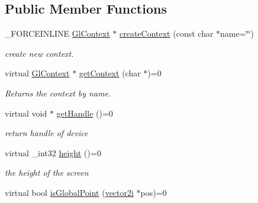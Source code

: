 \subsection*{Public Member Functions}
\begin{DoxyCompactItemize}
\item 
\hypertarget{classcsad_1_1_display_a20d187bd432fe8a53becfcf217f90029}{\-\_\-\-F\-O\-R\-C\-E\-I\-N\-L\-I\-N\-E \hyperlink{classcsad_1_1_gl_context}{Gl\-Context} $\ast$ \hyperlink{classcsad_1_1_display_a20d187bd432fe8a53becfcf217f90029}{create\-Context} (const char $\ast$name=\char`\"{}\char`\"{})}\label{classcsad_1_1_display_a20d187bd432fe8a53becfcf217f90029}

\begin{DoxyCompactList}\small\item\em create new context. \end{DoxyCompactList}\item 
\hypertarget{classcsad_1_1_display_aac6a3e516fe763e61fc6ddfeb130a8fb}{virtual \hyperlink{classcsad_1_1_gl_context}{Gl\-Context} $\ast$ \hyperlink{classcsad_1_1_display_aac6a3e516fe763e61fc6ddfeb130a8fb}{get\-Context} (char $\ast$)=0}\label{classcsad_1_1_display_aac6a3e516fe763e61fc6ddfeb130a8fb}

\begin{DoxyCompactList}\small\item\em Returns the context by name. \end{DoxyCompactList}\item 
\hypertarget{classcsad_1_1_display_a094ceb34dedd1d75b173cadf5bd00be3}{virtual void $\ast$ \hyperlink{classcsad_1_1_display_a094ceb34dedd1d75b173cadf5bd00be3}{get\-Handle} ()=0}\label{classcsad_1_1_display_a094ceb34dedd1d75b173cadf5bd00be3}

\begin{DoxyCompactList}\small\item\em return handle of device \end{DoxyCompactList}\item 
\hypertarget{classcsad_1_1_display_a6146300090d3c7fdb002b10b6259e45a}{virtual \-\_\-int32 \hyperlink{classcsad_1_1_display_a6146300090d3c7fdb002b10b6259e45a}{height} ()=0}\label{classcsad_1_1_display_a6146300090d3c7fdb002b10b6259e45a}

\begin{DoxyCompactList}\small\item\em the height of the screen \end{DoxyCompactList}\item 
\hypertarget{classcsad_1_1_display_ae56edf18d46dd676e5123936a6c35d84}{virtual bool \hyperlink{classcsad_1_1_display_ae56edf18d46dd676e5123936a6c35d84}{is\-Global\-Point} (\hyperlink{classbt_1_1vector2i}{vector2i} $\ast$pos)=0}\label{classcsad_1_1_display_ae56edf18d46dd676e5123936a6c35d84}


\end{DoxyCompactItemize}
